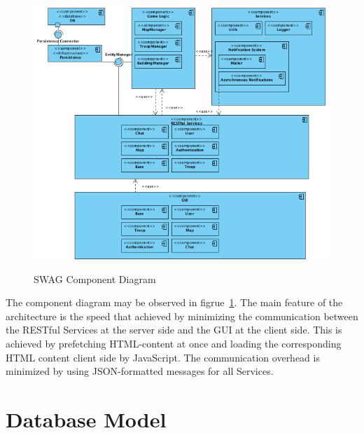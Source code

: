 \documentclass[a4paper]{article}
\begin{document}
\begin{figure}[ht!]
  \begin{center}
  \hspace*{-90pt}
  \includegraphics[scale=0.80]{fig/components.png}
  \label{fig:component_diagram}
  \caption{SWAG Component Diagram}
  \end{center}
\end{figure}

\hspace*{0pt}

The component diagram may be observed in figrue~\ref{fig:component_diagram}. The main feature of the architecture is the speed that achieved by minimizing the communication between the RESTful Services at the server side and the GUI at the client side. This is achieved by prefetching HTML-content at once and loading the corresponding HTML content client side by JavaScript. The communication overhead is minimized by using JSON-formatted messages for all Services.

\clearpage


\section{Database Model}
\end{document}
